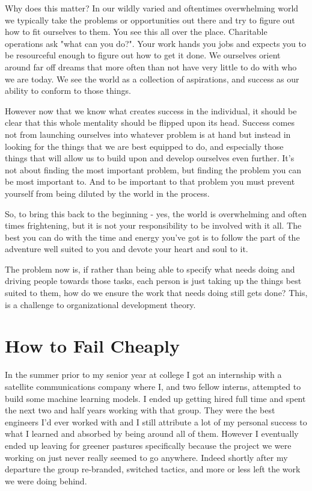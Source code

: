 \documentclass[11pt,a5paper]{book}
\begin{document}
Why does this matter? In our wildly varied and oftentimes overwhelming world we typically take the problems or opportunities out there and try to figure out how to fit ourselves to them. You see this all over the place. Charitable operations ask "what can you do?". Your work hands you jobs and expects you to be resourceful enough to figure out how to get it done. We ourselves orient around far off dreams that more often than not have very little to do with who we are today. We see the world as a collection of aspirations, and success as our ability to conform to those things. 
\newline

However now that we know what creates success in the individual, it should be clear that this whole mentality should be flipped upon its head. Success comes not from launching ourselves into whatever problem is at hand but instead in looking for the things that we are best equipped to do, and especially those things that will allow us to build upon and develop ourselves even further. It's not about finding the most important problem, but finding the problem you can be most important to. And to be important to that problem you must prevent yourself from being diluted by the world in the process. 
\newline

So, to bring this back to the beginning - yes, the world is overwhelming and often times frightening, but it is not your responsibility to be involved with it all. The best you can do with the time and energy you've got is to follow the part of the adventure well suited to you and devote your heart and soul to it. 
\newline

The problem now is, if rather than being able to specify what needs doing and driving people towards those tasks, each person is just taking up the things best suited to them, how do we ensure the work that needs doing still gets done? This, is a challenge to organizational development theory. 

\chapter{How to Fail Cheaply}
In the summer prior to my senior year at college I got an internship with a satellite communications company where I, and two fellow interns, attempted to build some machine learning models. I ended up getting hired full time and spent the next two and half years working with that group. They were the best engineers I'd ever worked with and I still attribute a lot of my personal success to what I learned and absorbed by being around all of them. However I eventually ended up leaving for greener pastures specifically because the project we were working on just never really seemed to go anywhere. Indeed shortly after my departure the group re-branded, switched tactics, and more or less left the work we were doing behind. 
\newline
\end{document}
